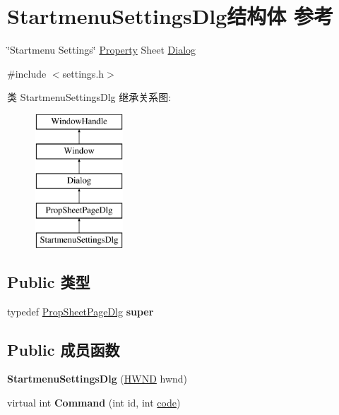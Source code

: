 \hypertarget{struct_startmenu_settings_dlg}{}\section{Startmenu\+Settings\+Dlg结构体 参考}
\label{struct_startmenu_settings_dlg}


\char`\"{}\+Startmenu Settings\char`\"{} \hyperlink{struct_property}{Property} Sheet \hyperlink{struct_dialog}{Dialog}  




{\ttfamily \#include $<$settings.\+h$>$}

类 Startmenu\+Settings\+Dlg 继承关系图\+:\begin{figure}[H]
\begin{center}
\leavevmode
\includegraphics[height=5.000000cm]{struct_startmenu_settings_dlg}
\end{center}
\end{figure}
\subsection*{Public 类型}
\begin{DoxyCompactItemize}
\item 
\mbox{\label{struct_startmenu_settings_dlg_ab250e0323776752f60b610f8912672d5}} 
typedef \hyperlink{struct_prop_sheet_page_dlg}{Prop\+Sheet\+Page\+Dlg} {\bfseries super}
\end{DoxyCompactItemize}
\subsection*{Public 成员函数}
\begin{DoxyCompactItemize}
\item 
\mbox{\label{struct_startmenu_settings_dlg_ac9a62641460424dca0873cd3f5f6fd6f}} 
{\bfseries Startmenu\+Settings\+Dlg} (\hyperlink{interfacevoid}{H\+W\+ND} hwnd)
\item 
\mbox{\label{struct_startmenu_settings_dlg_a7e277f38165e44b213d4a288a5497227}} 
virtual int {\bfseries Command} (int id, int \hyperlink{structcode}{code})
\end{DoxyCompactItemize}
